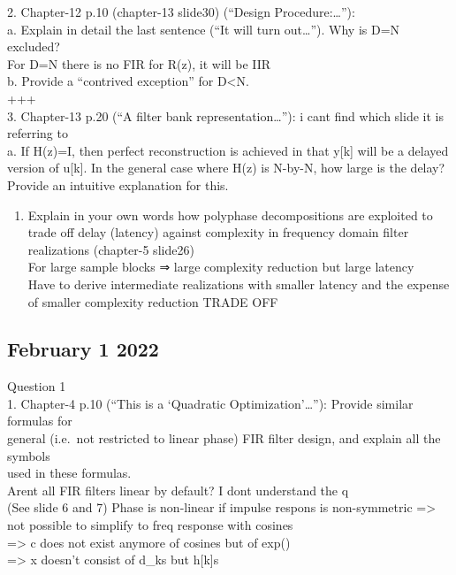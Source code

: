 \documentclass[
  a4paper,
  ,captions=tableheading
]{scrartcl}
\providecommand{\tightlist}{%
  \setlength{\itemsep}{0pt}\setlength{\parskip}{0pt}}
\begin{document}
2. Chapter-12 p.10 (chapter-13 slide30) (``Design
Procedure:\ldots{}''):\\
a. Explain in detail the last sentence (``It will turn out\ldots{}'').
Why is D=N excluded?\\
For D=N there is no FIR for R(z), it will be IIR\\
b. Provide a ``contrived exception'' for D\textless N.\\
+++\\
3. Chapter-13 p.20 (``A filter bank representation\ldots{}''): i cant
find which slide it is referring to\\
a. If H(z)=I, then perfect reconstruction is achieved in that y{[}k{]}
will be a delayed\\
version of u{[}k{]}. In the general case where H(z) is N-by-N, how large
is the delay?\\
Provide an intuitive explanation for this.

\begin{enumerate}
\def\labelenumi{\alph{enumi}.}
\setcounter{enumi}{1}
\tightlist
\item
  Explain in your own words how polyphase decompositions are exploited
  to trade off delay (latency) against complexity in frequency domain
  filter realizations (chapter-5 slide26)\\
  For large sample blocks ⇒ large complexity reduction but large
  latency\\
  Have to derive intermediate realizations with smaller latency and the
  expense of smaller complexity reduction TRADE OFF
\end{enumerate}

\subsection{February 1 2022}\label{february-1-2022}

Question 1\\
1. Chapter-4 p.10 (``This is a `Quadratic Optimization'\ldots{}''):
Provide similar formulas for\\
general (i.e.~not restricted to linear phase) FIR filter design, and
explain all the symbols\\
used in these formulas.\\
Arent all FIR filters linear by default? I dont understand the q\\
(See slide 6 and 7) Phase is non-linear if impulse respons is
non-symmetric =\textgreater{} not possible to simplify to freq response
with cosines\\
=\textgreater{} c does not exist anymore of cosines but of exp()\\
=\textgreater{} x doesn't consist of d\_ks but h{[}k{]}s
\end{document}

